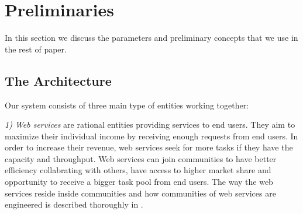\documentclass[10pt, conference, compsocconf]{IEEEtran}
\theoremstyle{plain}
\theoremstyle{definition}
\begin{document}
%
%

\section{Preliminaries}\label{s:preliminaries}

In this section we discuss the parameters and preliminary concepts that we use in the rest of paper. 

\subsection{The Architecture}

Our system consists of three main type of entities working together:


\emph{1) Web services} are rational entities providing services to end users. They aim to maximize their individual income by receiving enough requests from end users. In order to increase their revenue, web services seek for more tasks if they have the capacity and throughput. Web services can join communities to have better efficiency collabrating with others, have access to higher market share and opportunity to receive a bigger task pool from end users. The way the web services reside inside communities and how communities of web services are engineered is described thoroughly in \cite{DBLP:journals/ijebr/MaamarSTBB09}.
\end{document}
